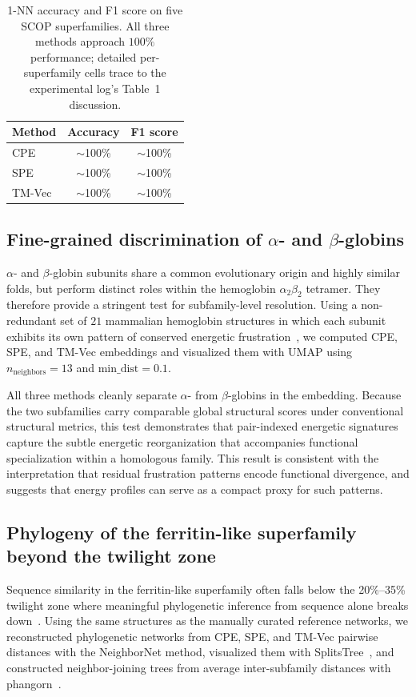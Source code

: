\documentclass[11pt]{article}
\begin{document}
\begin{table}[t]
\centering
\caption{1-NN accuracy and F1 score on five SCOP superfamilies. All three
methods approach $100\%$ performance; detailed per-superfamily cells trace to
the experimental log's Table~1 discussion.}
\label{tab:tab1}
\begin{tabular}{lcc}
\toprule
Method & Accuracy & F1 score \\
\midrule
CPE    & $\sim$100\% & $\sim$100\% \\
SPE    & $\sim$100\% & $\sim$100\% \\
TM-Vec & $\sim$100\% & $\sim$100\% \\
\bottomrule
\end{tabular}
\end{table}

\subsection{Fine-grained discrimination of $\alpha$- and $\beta$-globins}

$\alpha$- and $\beta$-globin subunits share a common evolutionary origin and
highly similar folds, but perform distinct roles within the hemoglobin
$\alpha_2 \beta_2$ tetramer. They therefore provide a stringent test for
subfamily-level resolution. Using a non-redundant set of $21$ mammalian
hemoglobin structures in which each subunit exhibits its own pattern of
conserved energetic frustration~\citep{freiberger2023frustration}, we
computed CPE, SPE, and TM-Vec embeddings and visualized them with UMAP
using $n_\text{neighbors}=13$ and $\text{min\_dist}=0.1$.

All three methods cleanly separate $\alpha$- from $\beta$-globins in the
embedding. Because the two subfamilies carry comparable global structural
scores under conventional structural metrics, this test demonstrates that
pair-indexed energetic signatures capture the subtle energetic
reorganization that accompanies functional specialization within a
homologous family. This result is consistent with the interpretation that
residual frustration patterns encode functional divergence, and suggests
that energy profiles can serve as a compact proxy for such patterns.

\subsection{Phylogeny of the ferritin-like superfamily beyond the twilight zone}

Sequence similarity in the ferritin-like superfamily often falls below the
20\%--35\% twilight zone where meaningful phylogenetic inference from
sequence alone breaks down~\citep{chothia1986twilight,lundin2012ferritin}.
Using the same structures as the manually curated reference networks, we
reconstructed phylogenetic networks from CPE, SPE, and TM-Vec pairwise
distances with the NeighborNet method, visualized them with
SplitsTree~\citep{huson2024splitstree}, and constructed neighbor-joining
trees from average inter-subfamily distances with
phangorn~\citep{schliep2011phangorn}.
\end{document}
